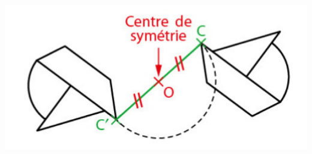 \documentclass[12pt,a4paper]{article}
\begin{document}
\begin{center}
	\includegraphics[scale=.75]{fig2}
\end{center}

\end{document}

